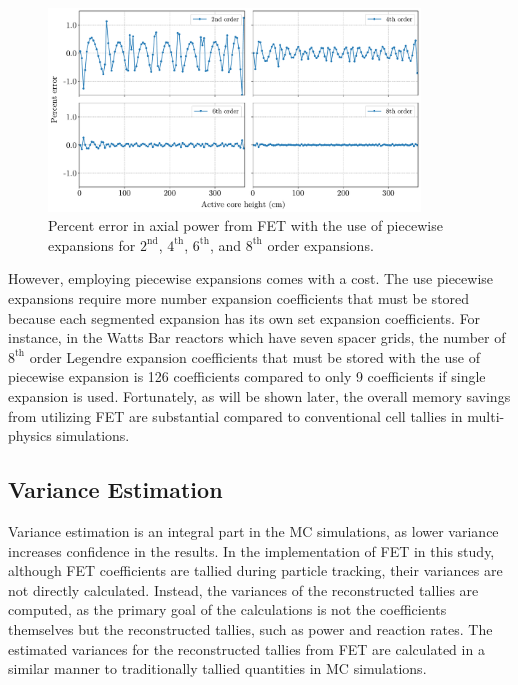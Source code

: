 \begin{figure}
    \centering
    \includegraphics[width=0.88\textwidth]{figs/piecewise.pdf}
    \caption[Percent error in axial power from FET with the use of piecewise expansions.]{Percent error in axial power from FET with the use of piecewise expansions for $2^\text{nd}$, $4^\text{th}$, $6^\text{th}$, and $8^\text{th}$ order expansions.}
    \label{fig_21z}
\end{figure}

However, employing piecewise expansions comes with a cost. The use piecewise expansions require more number expansion coefficients that must be stored because each segmented expansion has its own set expansion coefficients. For instance, in the Watts Bar reactors which have seven spacer grids, the number of $8^\text{th}$ order Legendre expansion coefficients that must be stored with the use of piecewise expansion is 126 coefficients compared to only 9 coefficients if single expansion is used. Fortunately, as will be shown later, the overall memory savings from utilizing FET are substantial compared to conventional cell tallies in multi-physics simulations.

\subsection{Variance Estimation}\label{sec22a}

Variance estimation is an integral part in the MC simulations, as lower variance increases confidence in the results. In the implementation of FET in this study, although FET coefficients are tallied during particle tracking, their variances are not directly calculated. Instead, the variances of the reconstructed tallies are computed, as the primary goal of the calculations is not the coefficients themselves but the reconstructed tallies, such as power and reaction rates. The estimated variances for the reconstructed tallies from FET are calculated in a similar manner to traditionally tallied quantities in MC simulations.

